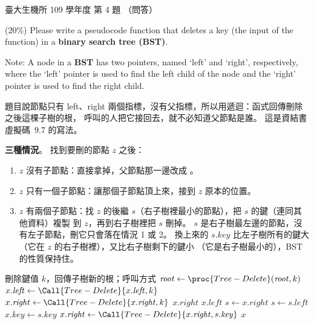 \begin{pastexam}[label={px:ntu-109-bime-ds-04}]{臺大生機所 109 學年度 第 4 題}
（問答）

(20\%) Please write a pseudocode function that deletes a key (the input of the function) in a
\textbf{binary search tree (BST)}.

Note: A node in a \textbf{BST} has two pointers, named `left' and `right', respectively, where the
`left' pointer is used to find the left child of the node and the `right' pointer is used to find
the right child.
\end{pastexam}

\begin{pastsoln}
題目說節點只有 left、right 兩個指標，沒有父指標，所以用遞迴：函式回傳刪除之後這棵子樹的根，
呼叫的人把它接回去，就不必知道父節點是誰。 這是資結書虛擬碼~9.7 的寫法。

\textbf{三種情況}。 找到要刪的節點 $z$ 之後：
\begin{enumerate}
\item $z$ 沒有子節點：直接拿掉，父節點那一邊改成 \NIL。
\item $z$ 只有一個子節點：讓那個子節點頂上來，接到 $z$ 原本的位置。
\item $z$ 有兩個子節點：找 $z$ 的後繼 $s$（右子樹裡最小的節點），把 $s$ 的鍵（連同其他資料）複製
到 $z$，再到右子樹裡把 $s$ 刪掉。 $s$ 是右子樹最左邊的節點，沒有左子節點，刪它只會落在情況 1
或 2。 換上來的 $s.\mathit{key}$ 比左子樹所有的鍵大（它在 $z$ 的右子樹裡），又比右子樹剩下的鍵小
（它是右子樹最小的），BST 的性質保持住。
\end{enumerate}

\begin{pseudo}{刪除鍵值 $k$，回傳子樹新的根；呼叫方式 $\mathit{root} \gets \proc{Tree-Delete}(\mathit{root}, k)$}
        \State \Return \NIL {}
    \EndIf
        \State $x.\mathit{left} \gets \Call{Tree-Delete}{x.\mathit{left}, k}$
        \State $x.\mathit{right} \gets \Call{Tree-Delete}{x.\mathit{right}, k}$
     
        \State \Return $x.\mathit{right}$
     
        \State \Return $x.\mathit{left}$
    \Else {}
        \State $s \gets x.\mathit{right}$
         
            \State $s \gets s.\mathit{left}$
        \EndWhile
        \State $x.\mathit{key} \gets s.\mathit{key}$ 
        \State $x.\mathit{right} \gets \Call{Tree-Delete}{x.\mathit{right}, s.\mathit{key}}$
    \EndIf
    \State \Return $x$
\EndFunction
\end{pseudo}


\end{pastsoln}
